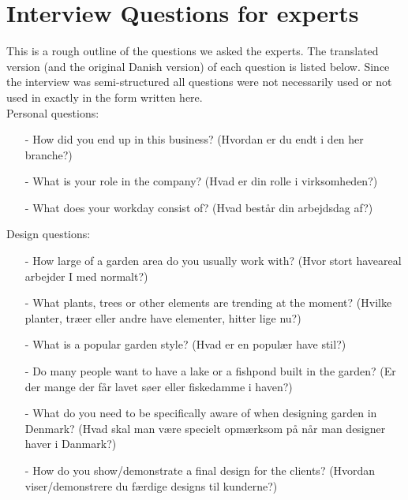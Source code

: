 \section{Interview Questions for experts}\label{sec:interviewQuestionsExperts}
This is a rough outline of the questions we asked the experts. The translated version (and the original Danish version) of each question is listed below. Since the interview was semi-structured all questions were not necessarily used or not used in exactly in the form written here.\\

Personal questions:
\begin{itemize}
	\item[-] How did you end up in this business? (Hvordan er du endt i den her branche?)
	\item[-] What is your role in the company? (Hvad er din rolle i virksomheden?)
	\item[-] What does your workday consist of? (Hvad består din arbejdsdag af?)\\
\end{itemize}

Design questions:
\begin{itemize}
	\item[-] How large of a garden area do you usually work with? (Hvor stort haveareal arbejder I med normalt?)
	\item[-] What plants, trees or other elements are trending at the moment? (Hvilke planter, træer eller andre have elementer, hitter lige nu?)
	\item[-] What is a popular garden style? (Hvad er en populær have stil?)
	\item[-] Do many people want to have a lake or a fishpond built in the garden? (Er der mange der får lavet søer eller fiskedamme i haven?)
	\item[-] What do you need to be specifically aware of when designing garden in Denmark? (Hvad skal man være specielt opmærksom på når man designer haver i Danmark?)
	\item[-] How do you show/demonstrate a final design for the clients? (Hvordan viser/demonstrere du færdige designs til kunderne?)\\
\end{itemize}

